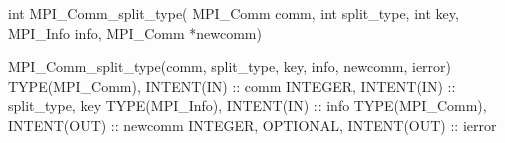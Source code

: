 int MPI_Comm_split_type(
  MPI_Comm comm, int split_type, int key,
  MPI_Info info, MPI_Comm *newcomm)

MPI_Comm_split_type(comm, split_type, key, info, newcomm, ierror)
TYPE(MPI_Comm), INTENT(IN) :: comm
INTEGER, INTENT(IN) :: split_type, key
TYPE(MPI_Info), INTENT(IN) :: info
TYPE(MPI_Comm), INTENT(OUT) :: newcomm
INTEGER, OPTIONAL, INTENT(OUT) :: ierror 
